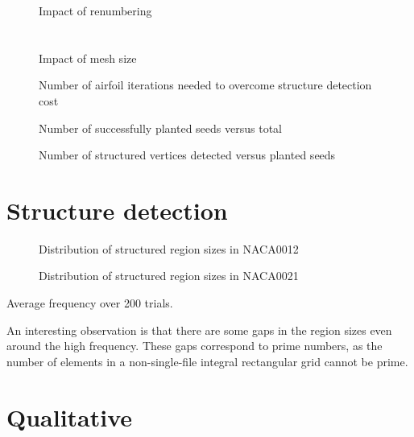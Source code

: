 \begin{figure}[h]
  \centering
  
\caption{Impact of renumbering}
\label{fig:plot-airfoil-numbering}
\end{figure}


\section{}

\begin{figure}[h]
  \centering
  
\caption{Impact of mesh size}
\label{fig:plot-airfoil-size-runtime}
\end{figure}


\begin{figure}[h]
  \centering
  
\caption{Number of airfoil iterations needed to overcome structure detection cost}
\label{fig:plot-airfoil-iterations}
\end{figure}



\begin{figure}[h]
  \centering
  
\caption{Number of successfully planted seeds versus total}
\label{fig:plot-naac0012-failedseeds-over-seeds}
\end{figure}


\begin{figure}[h]
  \centering
  
\caption{Number of structured vertices detected versus planted seeds}
\label{fig:plot-naca0012-structure-over-seeds}
\end{figure}




\section{Structure detection}

\begin{figure}[h]
  \centering
  
\caption{Distribution of structured region sizes in NACA0012}
\label{fig:plot-naca0012-region-sizes}
\end{figure}

\begin{figure}[h]
  \centering
  
\caption{Distribution of structured region sizes in NACA0021}
\label{fig:plot-naca0021-region-sizes}
\end{figure}

Average frequency over 200 trials.

An interesting observation is that there are some gaps in the region sizes even around the high frequency. These gaps correspond to prime numbers, as the number of elements in a non-single-file integral rectangular grid cannot be prime.

\section{Qualitative}


